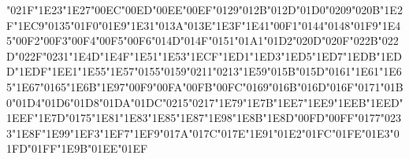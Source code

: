 {\char"021F\gs \char"1E23\gs \char"1E27\gs \char"00EC\gs \char"00ED\gs \char"00EE\gs \char"00EF\gs \char"0129\gs \char"012B\gs \char"012D\gs \char"01D0\gs \char"0209\gs \char"020B\gs \char"1E2F\gs \char"1EC9\gs \char"0135\gs \char"01F0\gs \char"01E9\gs \char"1E31\gs \char"013A\gs \char"013E\gs \char"1E3F\gs \char"1E41\gs \char"00F1\gs \char"0144\gs \char"0148\gs \char"01F9\gs \char"1E45\gs \char"00F2\gs \char"00F3\gs \char"00F4\gs \char"00F5\gs \char"00F6\gs \char"014D\gs \char"014F\gs \char"0151\gs \char"01A1\gs \char"01D2\gs \char"020D\gs \char"020F\gs \char"022B\gs \char"022D\gs \char"022F\gs \char"0231\gs \char"1E4D\gs \char"1E4F\gs \char"1E51\gs \char"1E53\gs \char"1ECF\gs \char"1ED1\gs \char"1ED3\gs \char"1ED5\gs \char"1ED7\gs \char"1EDB\gs \char"1EDD\gs \char"1EDF\gs \char"1EE1\gs \char"1E55\gs \char"1E57\gs \char"0155\gs \char"0159\gs \char"0211\gs \char"0213\gs \char"1E59\gs \char"015B\gs \char"015D\gs \char"0161\gs \char"1E61\gs \char"1E65\gs \char"1E67\gs \char"0165\gs \char"1E6B\gs \char"1E97\gs \char"00F9\gs \char"00FA\gs \char"00FB\gs \char"00FC\gs \char"0169\gs \char"016B\gs \char"016D\gs \char"016F\gs \char"0171\gs \char"01B0\gs \char"01D4\gs \char"01D6\gs \char"01D8\gs \char"01DA\gs \char"01DC\gs \char"0215\gs \char"0217\gs \char"1E79\gs \char"1E7B\gs \char"1EE7\gs \char"1EE9\gs \char"1EEB\gs \char"1EED\gs \char"1EEF\gs \char"1E7D\gs \char"0175\gs \char"1E81\gs \char"1E83\gs \char"1E85\gs \char"1E87\gs \char"1E98\gs \char"1E8B\gs \char"1E8D\gs \char"00FD\gs \char"00FF\gs \char"0177\gs \char"0233\gs \char"1E8F\gs \char"1E99\gs \char"1EF3\gs \char"1EF7\gs \char"1EF9\gs \char"017A\gs \char"017C\gs \char"017E\gs \char"1E91\gs \char"01E2\gs \char"01FC\gs \char"01FE\gs \char"01E3\gs \char"01FD\gs \char"01FF\gs \char"1E9B\gs \char"01EE\gs \char"01EF\gs
}

